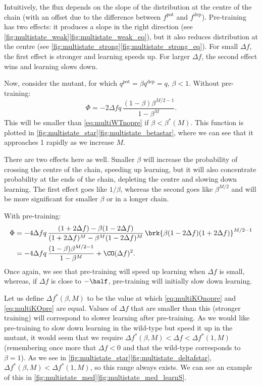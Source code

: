 \documentclass[12pt]{article}
\newcommand{\pot}{^{\text{pot}}}
\newcommand{\dep}{^{\text{dep}}}
\begin{document}
Intuitively, the flux depends on the slope of the distribution at the centre of the chain (with an offset due to the difference between $f\pot$ and $f\dep$).
Pre-training has two effects: it produces a slope in the right direction (see \autoref{fig:multistate_weak}\ref{fig:multistate_weak_eq}), but it also reduces distribution at the centre (see \autoref{fig:multistate_strong}\ref{fig:multistate_strong_eq}).
For small $\Delta f$, the first effect is stronger and learning speeds up.
For larger $\Delta f$, the second effect wins and learning slows down.

Now, consider the mutant, for which $q\pot=\beta q\dep=q$, $\beta<1$.
Without pre-training:
%
\begin{equation}\label{eq:multiKOnopre}
  \Phi = -2\Delta f q\,\frac{(1-\beta)\beta^{M/2-1}}{1-\beta^M}.
\end{equation}
%
This will be smaller than \eqref{eq:multiWTnopre} if $\beta<\beta^*(M)$.
This function is plotted in \autoref{fig:multistate_star}\ref{fig:multistate_betastar}, where we can see that it approaches 1 rapidly as we increase $M$.

There are two effects here as well.
Smaller $\beta$ will increase the probability of crossing the centre of the chain, speeding up learning, but it will also concentrate probability at the ends of the chain, depleting the centre and slowing down learning.
The first effect goes like $1/\beta$, whereas the second goes like $\beta^{M/2}$ and will be more significant for smaller $\beta$ or in a longer chain.

With pre-training:
%
\begin{equation}\label{eq:multiKOpre}
\begin{aligned}
  \Phi &= -4\Delta f q \, \frac{(1+2\Delta f) - \beta(1-2\Delta f)}
          {(1+2\Delta f)^M - \beta^M(1-2\Delta f)^M}   \,
          \brk{\beta (1-2\Delta f) (1+2\Delta f)}^{M/2-1} \\
       &= -4\Delta f q\,\frac{(1-\beta)\beta^{M/2-1}}{1-\beta^M} + \CO(\Delta f)^2.
\end{aligned}
\end{equation}
%
Once again, we see that pre-training will speed up learning when $\Delta f$ is small, whereas, if $\Delta f$ is close to $-\half$, pre-training will initially slow down learning.

Let us define $\Delta f^*(\beta,M)$ to be the value at which \eqref{eq:multiKOnopre} and \eqref{eq:multiKOpre} are equal.
Values of $\Delta f$ that are smaller than this (stronger training) will correspond to slower learning after pre-training.
As we would like pre-training to slow down learning in the wild-type but speed it up in the mutant, it would seem that we require $\Delta f^*(\beta,M) < \Delta f < \Delta f^*(1,M)$ (remembering once more that $\Delta f<0$ and that the wild-type corresponds to $\beta=1$).
As we see in \autoref{fig:multistate_star}\ref{fig:multistate_deltafstar}, $\Delta f^*(\beta,M) < \Delta f^*(1,M)$, so this range always exists.
We can see an example of this in \autoref{fig:multistate_med}\ref{fig:multistate_med_learnS}.
\end{document}
